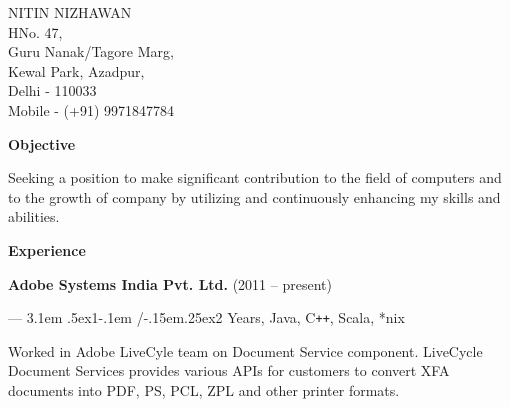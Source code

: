 \documentclass{article}
\begin{document}
\newcommand{\myhalf}{\kern-0.125em{\thinspace\tiny\raisebox{0.5em}{1}\kern-0.125em\raisebox{0.25em}{/}\kern-0.25em\raisebox{-0.1em}{2}}}
\newcommand{\fracttb}[2]{\leavevmode\kern.1em
\raise.5ex\hbox{\scriptsize #1}\kern-.1em
\normalsize{/}\kern-.15em\lower.25ex\hbox{\scriptsize #2}}
  \begin{flushright}

{\LARGE NITIN NIZHAWAN}\\[11pt]
HNo. 47,\\
Guru Nanak/Tagore Marg,\\
Kewal Park, Azadpur,\\
Delhi - 110033\\
Mobile - (+91) 9971847784
  \end{flushright}
\hrulefill

\begin{flushleft} {\large\bf Objective}
\end{flushleft}
Seeking a position to make significant contribution to the field of computers and to the growth of company by utilizing and continuously enhancing my skills and abilities.
\begin{flushleft}
\large\bf{Experience}
\end{flushleft}

\begin{center}
   {\bf Adobe Systems India Pvt. Ltd.} (2011 -- present)\\
\end{center}
\begin{flushright} --- 3\fracttb{1}{2}  Years, Java, C{}\verb!++!, Scala, *nix \end{flushright}
   Worked in Adobe LiveCyle team on Document Service component. LiveCycle Document Services provides various APIs for customers to convert XFA documents into PDF, PS, PCL, ZPL and other printer formats.\\
   
\end{document}
